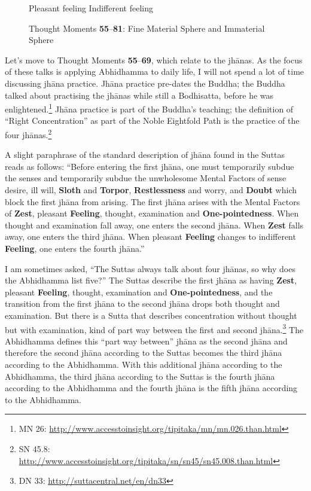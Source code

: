 \begin{figure}[h]
\begin{center}
\smiley\hspace{2mm} Pleasant feeling\hspace{5mm}\neutral\hspace{2mm} Indifferent feeling
\end{center}

\caption{Thought Moments \textbf{55}--\textbf{81}: Fine Material Sphere and Immaterial Sphere}
\label{fig:55to81}
\end{figure}

Let’s move to Thought Moments \textbf{55}--\textbf{69}, which relate to the jhānas. As the focus of these talks is applying Abhidhamma to daily life, I will not spend a lot of time discussing jhāna practice. Jhāna practice pre-dates the Buddha; the Buddha talked about practising the jhānas while still a Bodhisatta, before he was enlightened.\footnote{MN 26: \url{http://www.accesstoinsight.org/tipitaka/mn/mn.026.than.html}} Jhāna practice is part of the Buddha’s teaching; the definition of “Right Concentration” as part of the Noble Eightfold Path is the practice of the four jhānas.\footnote{SN 45.8: \url{http://www.accesstoinsight.org/tipitaka/sn/sn45/sn45.008.than.html}}

A slight paraphrase of the standard description of jhāna found in the Suttas reads as follows: “Before entering the first jhāna, one must temporarily subdue the senses and temporarily subdue the unwholesome Mental Factors of sense desire, ill will, \textbf{Sloth} and \textbf{Torpor}, \textbf{Restlessness} and worry, and \textbf{Doubt} which block the first jhāna from arising. The first jhāna arises with the Mental Factors of \textbf{Zest}, pleasant \textbf{Feeling}, thought, examination and \textbf{One-pointedness}. When thought and examination fall away, one enters the second jhāna. When \textbf{Zest} falls away, one enters the third jhāna. When pleasant \textbf{Feeling} changes to indifferent \textbf{Feeling}, one enters the fourth jhāna.”

I am sometimes asked, “The Suttas always talk about four jhānas, so why does the Abhidhamma list five?” The Suttas describe the first jhāna as having \textbf{Zest}, pleasant \textbf{Feeling}, thought, examination and \textbf{One-pointedness}, and the transition from the first jhāna to the second jhāna drops both thought and examination. But there is a Sutta that describes concentration without thought but with examination, kind of part way between the first and second jhāna.\footnote{DN 33: \url{http://suttacentral.net/en/dn33}} The Abhidhamma defines this “part way between” jhāna as the second jhāna and therefore the second jhāna according to the Suttas becomes the third jhāna according to the Abhidhamma. With this additional jhāna according to the Abhidhamma, the third jhāna according to the Suttas is the fourth jhāna according to the Abhidhamma and the fourth jhāna is the fifth jhāna according to the Abhidhamma.

